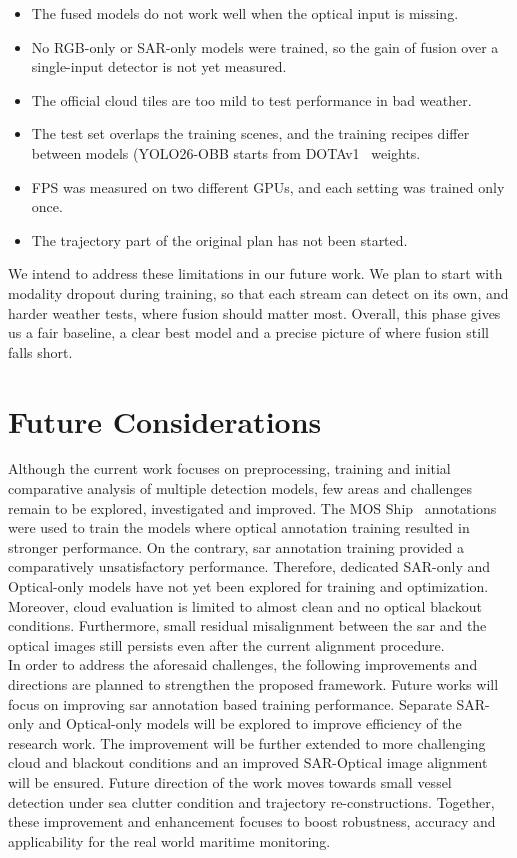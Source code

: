 \begin{itemize}
    \item The fused models do not work well when the optical input is missing.
    \item No RGB-only or SAR-only models were trained, so the gain of fusion over a single-input detector is not yet measured.
    \item The official cloud tiles are too mild to test performance in bad weather.
    \item The test set overlaps the training scenes, and the training recipes differ between models (YOLO26-OBB starts from DOTAv1~\cite{xia2018dota} weights.
    \item FPS was measured on two different GPUs, and each setting was trained only once.
    \item The trajectory part of the original plan has not been started.
\end{itemize}

We intend to address these limitations in our future work. We plan to start with modality dropout during training, so that each stream can detect on its own, and harder weather tests, where fusion should matter most. Overall, this phase gives us a fair baseline, a clear best model and a precise picture of where fusion still falls short.



\section{Future Considerations}
Although the current work focuses on preprocessing, training and initial comparative  analysis of multiple detection models, few areas and challenges remain to be explored, investigated and improved. The MOS Ship~\cite{you2026multi} annotations were used to train the models   where optical annotation training resulted in stronger performance. On the contrary, sar annotation training provided a comparatively unsatisfactory performance. Therefore, dedicated SAR-only and Optical-only models have not yet been explored for training and optimization. Moreover, cloud evaluation is limited to almost clean and no optical blackout conditions. Furthermore, small residual misalignment between the sar and the optical images still persists even after the current alignment procedure.\\

In order to address the aforesaid challenges, the following improvements and directions are planned to strengthen the proposed framework. Future works will  focus on improving sar annotation based training performance. Separate SAR-only and Optical-only models will be explored to improve efficiency of the research work. The improvement will be further extended to  more challenging cloud and blackout conditions and an improved SAR-Optical image alignment will be ensured. Future direction of the work moves towards small vessel detection under sea clutter condition and trajectory re-constructions. Together, these improvement and enhancement focuses to boost robustness, accuracy and applicability for the real world maritime monitoring.
\\

